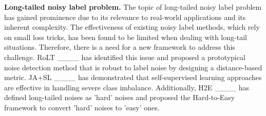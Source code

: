 \textbf{Long-tailed noisy label problem.} The topic of long-tailed noisy label problem has gained prominence due to its relevance to real-world applications and its inherent complexity. The effectiveness of existing noisy label methods, which rely on small loss tricks, has been found to be limited when dealing with long-tail situations. Therefore, there is a need for a new framework to address this challenge. RoLT ____ has identified this issue and proposed a prototypical noise detection method that is robust to label noise by designing a distance-based metric. JA+SL ____ has demonstrated that self-supervised learning approaches are effective in handling severe class imbalance. Additionally, H2E ____ has defined long-tailed noises as 'hard' noises and proposed the Hard-to-Easy framework to convert 'hard' noises to 'easy' ones.

